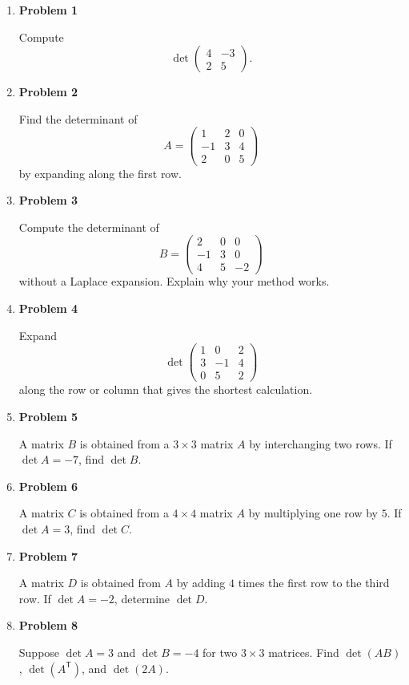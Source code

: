 \begin{enumerate}
\item \textbf{Problem 1}\par
Compute
\[
\det\begin{pmatrix}4&-3\\2&5\end{pmatrix}.
\]

\item \textbf{Problem 2}\par
Find the determinant of
\[
A=\begin{pmatrix}
1&2&0\\
-1&3&4\\
2&0&5
\end{pmatrix}
\]
by expanding along the first row.

\item \textbf{Problem 3}\par
Compute the determinant of
\[
B=\begin{pmatrix}
2&0&0\\
-1&3&0\\
4&5&-2
\end{pmatrix}
\]
without a Laplace expansion. Explain why your method works.

\item \textbf{Problem 4}\par
Expand
\[
\det\begin{pmatrix}
1&0&2\\
3&-1&4\\
0&5&2
\end{pmatrix}
\]
along the row or column that gives the shortest calculation.

\item \textbf{Problem 5}\par
A matrix \(B\) is obtained from a \(3\times3\) matrix \(A\) by interchanging two rows. If \(\det A=-7\), find \(\det B\).

\item \textbf{Problem 6}\par
A matrix \(C\) is obtained from a \(4\times4\) matrix \(A\) by multiplying one row by \(5\). If \(\det A=3\), find \(\det C\).

\item \textbf{Problem 7}\par
A matrix \(D\) is obtained from \(A\) by adding \(4\) times the first row to the third row. If \(\det A=-2\), determine \(\det D\).

\item \textbf{Problem 8}\par
Suppose \(\det A=3\) and \(\det B=-4\) for two \(3\times3\) matrices. Find \(\det(AB)\), \(\det(A^{\mathsf T})\), and \(\det(2A)\).


\end{enumerate}

